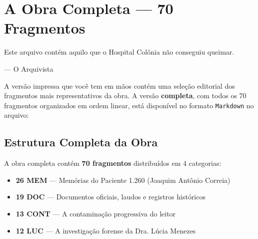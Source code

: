 
\chapter*{A Obra Completa — 70 Fragmentos}

\epigraph{Este arquivo contém aquilo que o Hospital Colônia não conseguiu queimar.}{--- O Arquivista}

\noindent A versão impressa que você tem em mãos contém uma seleção editorial dos fragmentos mais representativos da obra. A versão \textbf{completa}, com todos os 70 fragmentos organizados em ordem linear, está disponível no formato \texttt{Markdown} no arquivo:

\begin{center}
\vspace{0.5cm}
\vspace{0.5cm}
\end{center}

\section*{Estrutura Completa da Obra}

A obra completa contém \textbf{70 fragmentos} distribuídos em 4 categorias:

\begin{itemize}
    \item \textbf{26 MEM} — Memórias do Paciente 1.260 (Joaquim Antônio Correia)
    \item \textbf{19 DOC} — Documentos oficiais, laudos e registros históricos
    \item \textbf{13 CONT} — A contaminação progressiva do leitor
    \item \textbf{12 LUC} — A investigação forense da Dra. Lúcia Menezes
\end{itemize}

\vspace{0.3cm}


